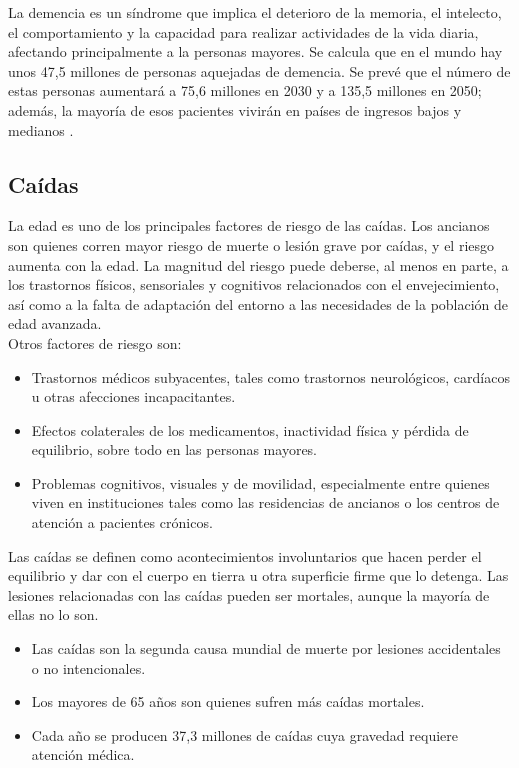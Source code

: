 La demencia es un síndrome que implica el deterioro de la memoria, el intelecto, el comportamiento y la capacidad para realizar actividades de la vida diaria, afectando principalmente a la personas mayores. Se calcula que en el mundo hay unos 47,5 millones de personas aquejadas de demencia. Se prevé que el número de estas personas aumentará a 75,6 millones en 2030 y a 135,5 millones en 2050; además, la mayoría de esos pacientes vivirán en países de ingresos bajos y medianos \cite{ocho}.

\subsection{Caídas}

La edad es uno de los principales factores de riesgo de las caídas. Los ancianos son quienes corren mayor riesgo de muerte o lesión grave por caídas, y el riesgo aumenta con la edad. La magnitud del riesgo puede deberse, al menos en parte, a los trastornos físicos, sensoriales y cognitivos relacionados con el envejecimiento, así como a la falta de adaptación del entorno a las necesidades de la población de edad avanzada. \\

Otros factores de riesgo son:

\begin{itemize}
	\item Trastornos médicos subyacentes, tales como trastornos neurológicos, cardíacos u otras afecciones incapacitantes.
	\item Efectos colaterales de los medicamentos, inactividad física y pérdida de equilibrio, sobre todo en las personas mayores.
	\item Problemas cognitivos, visuales y de movilidad, especialmente entre quienes viven en instituciones tales como las residencias de ancianos o los centros de atención a pacientes crónicos. 
\end{itemize}

Las caídas se definen como acontecimientos involuntarios que hacen perder el equilibrio y dar con el cuerpo en tierra u otra superficie firme que lo detenga. Las lesiones relacionadas con las caídas pueden ser mortales, aunque la mayoría de ellas no lo son. \\

\begin{itemize}
	\item Las caídas son la segunda causa mundial de muerte por lesiones accidentales o no intencionales.
	\item Los mayores de 65 años son quienes sufren más caídas mortales.
	\item Cada año se producen 37,3 millones de caídas cuya gravedad requiere atención médica.
\end{itemize}

